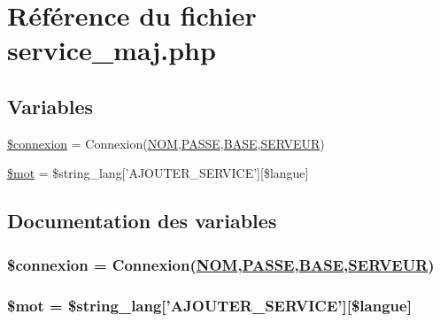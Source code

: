 \hypertarget{service__maj_8php}{
\section{R\'{e}f\'{e}rence du fichier service\_\-maj.php}
\label{service__maj_8php}
}
\subsection*{Variables}
\begin{CompactItemize}
\item 
\hyperlink{service__maj_8php_a0}{\$connexion} = Connexion(\hyperlink{pma__connect_8php_a0}{NOM},\hyperlink{pma__connect_8php_a1}{PASSE},\hyperlink{pma__connect_8php_a3}{BASE},\hyperlink{pma__connect_8php_a2}{SERVEUR})
\item 
\hyperlink{service__maj_8php_a1}{\$mot} = \$string\_\-lang\mbox{[}'AJOUTER\_\-SERVICE'\mbox{]}\mbox{[}\$langue\mbox{]}
\end{CompactItemize}


\subsection{Documentation des variables}
\hypertarget{service__maj_8php_a0}{
\subsubsection[\$connexion]{\setlength{\rightskip}{0pt plus 5cm}\$connexion = Connexion(\hyperlink{pma__connect_8php_a0}{NOM},\hyperlink{pma__connect_8php_a1}{PASSE},\hyperlink{pma__connect_8php_a3}{BASE},\hyperlink{pma__connect_8php_a2}{SERVEUR})}}
\label{service__maj_8php_a0}


\hypertarget{service__maj_8php_a1}{
\subsubsection[\$mot]{\setlength{\rightskip}{0pt plus 5cm}\$mot = \$string\_\-lang\mbox{[}'AJOUTER\_\-SERVICE'\mbox{]}\mbox{[}\$langue\mbox{]}}}
\label{service__maj_8php_a1}


